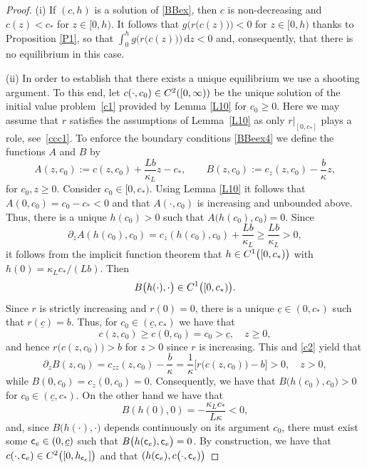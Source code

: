 \documentclass[10pt,a4paper]{amsart}
\newcommand{\rd}{\mathrm{d}}
\begin{document}
\begin{proof}
(i) If $(c,h)$ is a solution of \eqref{BBex}, then $c$ is
  non-decreasing and $c(z)< c_*$ for $z\in [0,h)$. It follows that
  $g\bigl( r\bigl(c(z)\bigr)\bigr)< 0$ for $z\in [0,h)$ thanks to
  Proposition \ref{P1}, so that
  $\int_0^h g\bigl( r\bigl(c(z)\bigr)\bigr)\,\rd z<0$ and,
  consequently, that there is no equilibrium in this case.

(ii) In order to establish that there exists a unique
  equilibrium we use a shooting argument. To this end, let
  $c(\cdot,c_0)\in {\rm C}^2([0,\infty))$ be the unique solution of
  the initial value problem~\eqref{c1} provided by Lemma \ref{L10} for
  $c_0\ge 0$. Here we may assume that $r$ satisfies the assumptions
  of Lemma~\ref{L10} as only $r\big |_{[0,c_*]}$ plays a role,
  see~\eqref{ccc1}.
  To enforce the boundary conditions \eqref{BBeex4} we define the
  functions $A$ and $B$ by
  $$
  A(z,c_0):=c(z,c_0)+\frac{L b}{\kappa_L}z-c_*, \qquad
  B(z,c_0):=c_z(z,c_0)-\frac{b}{\kappa}z,
  $$
  for $c_0,z\ge 0$. Consider $c_0\in [0,c_*)$. Using Lemma
  \ref{L10} it follows that $A(0,c_0)=c_0-c_*< 0$ and that
  $A(\cdot,c_0)$ is increasing and 
  unbounded above. Thus, there is a unique $h(c_0)> 0$ such that
  $A\bigl(h(c_0), c_0\bigr)=0$. Since 
$$
\partial_z A(h(c_0), c_0)= c_z(h(c_0),c_0)+\frac{L b}{\kappa_L}\ge
\frac{L b}{\kappa_L}>0, 
$$ 
it follows from the implicit function theorem that
$h\in{\rm C}^1\bigl([0,c_*)\bigr)$ with $h(0)=\kappa_L
c_*/(Lb)$.
Then 
  $$
  B\bigl( h(\cdot),\cdot\bigr)\in{\rm C}^1\bigl([0,c_*)\bigr).
  $$
  Since $r$ is strictly increasing and $r(0)=0$, there is a unique
  $\underline{c}\in (0,c_*)$ such that $r(\underline{c})=b$. Thus, for
  $c_0\in (\underline{c},c_*)$ we have that
  $$
  c(z,c_0)\geq c(0,c_0)=c_0>\underline{c},\quad z\geq 0,
  $$
  and hence $r\bigl( c(z,c_0)\bigr)>b$ for $z>0$ since
  $r$ is increasing. This and \eqref{c2} yield that
  $$
  \partial_z
  B(z,c_0)=c_{zz}(z,c_0)-\frac{b}{\kappa}=\frac{1}{\kappa}
  \big[r\bigl(c(z,c_0)\bigr)-b\big]>0,\quad z>0,
  $$
  while $B(0,c_0)=c_z(0,c_0)=0$. Consequently, we have that $B\bigl(
  h(c_0),c_0\bigr)>0$ for $c_0\in (\underline{c},c_*)$. On the other
  hand we have that
  $$
  B(h(0),0)=-\frac{\kappa_L c_*}{L\kappa}<0,
  $$
  and, since $B\bigl( h(\cdot),\cdot\bigr)$ depends continuously on
  its argument $c_0$, there must exist some ${\sf c}_e\in (0,\underline{c})$
  such that $B\bigl (h({\sf c}_e),{\sf c}_e\bigr)=0$. By construction, we have
  that $c(\cdot,{\sf c}_e)\in{\rm C}^2\bigl([0,h_{{\sf c}_e}]\bigr)$
  and that $(h({\sf c}_e),c\bigl( \cdot,{\sf c}_e)\bigr)$

\end{proof}
\end{document}
